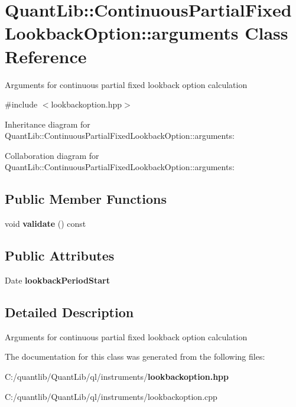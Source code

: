 \section{Quant\+Lib\+:\+:Continuous\+Partial\+Fixed\+Lookback\+Option\+:\+:arguments Class Reference}
\label{class_quant_lib_1_1_continuous_partial_fixed_lookback_option_1_1arguments}


Arguments for continuous partial fixed lookback option calculation  




{\ttfamily \#include $<$lookbackoption.\+hpp$>$}



Inheritance diagram for Quant\+Lib\+:\+:Continuous\+Partial\+Fixed\+Lookback\+Option\+:\+:arguments\+:


Collaboration diagram for Quant\+Lib\+:\+:Continuous\+Partial\+Fixed\+Lookback\+Option\+:\+:arguments\+:
\subsection*{Public Member Functions}
\begin{DoxyCompactItemize}
\item 
void {\bfseries validate} () const \label{class_quant_lib_1_1_continuous_partial_fixed_lookback_option_1_1arguments_a4464db4d049db5c116b8ae6f171d0d4a}

\end{DoxyCompactItemize}
\subsection*{Public Attributes}
\begin{DoxyCompactItemize}
\item 
Date {\bfseries lookback\+Period\+Start}\label{class_quant_lib_1_1_continuous_partial_fixed_lookback_option_1_1arguments_af6e30f467091f8380e90a8e250a96aa4}

\end{DoxyCompactItemize}


\subsection{Detailed Description}
Arguments for continuous partial fixed lookback option calculation 

The documentation for this class was generated from the following files\+:\begin{DoxyCompactItemize}
\item 
C\+:/quantlib/\+Quant\+Lib/ql/instruments/{\bf lookbackoption.\+hpp}\item 
C\+:/quantlib/\+Quant\+Lib/ql/instruments/lookbackoption.\+cpp\end{DoxyCompactItemize}
